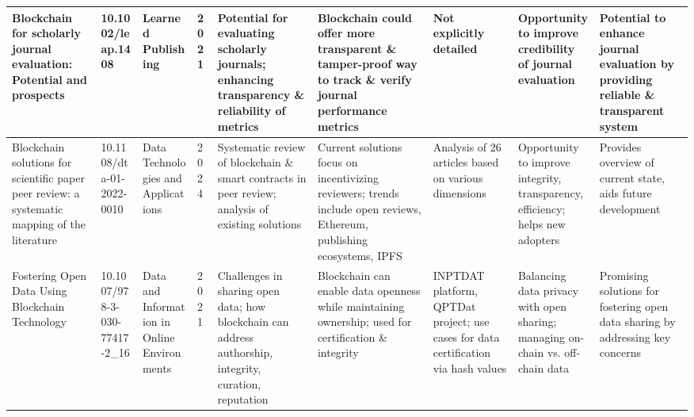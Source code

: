 \documentclass[final]{rc-book-2.14}
\begin{document}
\begin{landscape}
\begin{table}[ht]
\begin{tabularx}{\linewidth}{|p{3.5cm}|p{2.5cm}|p{3cm}|p{1.8cm}|X|X|X|X|X|}
            \hline
            Blockchain for scholarly journal evaluation: Potential and prospects                                                               & 10.1002/leap.1408             & Learned Publishing                                             & 2021                      & Potential for evaluating scholarly journals; enhancing transparency \& reliability of metrics                               & Blockchain could offer more transparent \& tamper-proof way to track \& verify journal performance metrics                                     & Not explicitly detailed                                                                                 & Opportunity to improve credibility of journal evaluation                                                                            & Potential to enhance journal evaluation by providing reliable \& transparent system                   \\
            \hline
            Blockchain solutions for scientific paper peer review: a systematic mapping of the literature                                      & 10.1108/dta-01-2022-0010      & Data Technologies and Applications                             & 2024                      & Systematic review of blockchain \& smart contracts in peer review; analysis of existing solutions                           & Current solutions focus on incentivizing reviewers; trends include open reviews, Ethereum, publishing ecosystems, IPFS                         & Analysis of 26 articles based on various dimensions                                                     & Opportunity to improve integrity, transparency, efficiency; helps new adopters                                                      & Provides overview of current state, aids future development                                           \\
            \hline
            Fostering Open Data Using Blockchain Technology                                                                                    & 10.1007/978-3-030-77417-2\_16 & Data and Information in Online Environments                    & 2021                      & Challenges in sharing open data; how blockchain can address authorship, integrity, curation, reputation                     & Blockchain can enable data openness while maintaining ownership; used for certification \& integrity                                           & INPTDAT platform, QPTDat project; use cases for data certification via hash values                      & Balancing data privacy with open sharing; managing on-chain vs. off-chain data                                                      & Promising solutions for fostering open data sharing by addressing key concerns                        \\

\end{tabularx}
\end{table}
\end{landscape}
\end{document}
